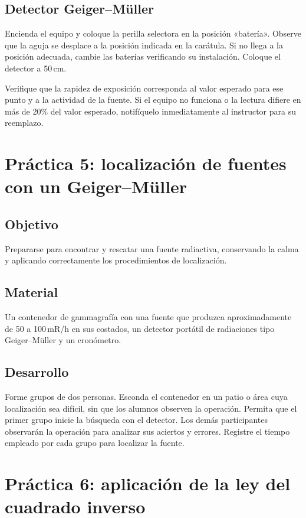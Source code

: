 \subsection*{Detector Geiger--Müller}
Encienda el equipo y coloque la perilla selectora en la posición «batería». Observe que la aguja se desplace a la posición indicada en la carátula. Si no llega a la posición adecuada, cambie las baterías verificando su instalación. Coloque el detector a 50\,cm.

Verifique que la rapidez de exposición corresponda al valor esperado para ese punto y a la actividad de la fuente. Si el equipo no funciona o la lectura difiere en más de 20\% del valor esperado, notifíquelo inmediatamente al instructor para su reemplazo.

\section{Práctica 5: localización de fuentes con un Geiger--Müller}

\subsection*{Objetivo}
Prepararse para encontrar y rescatar una fuente radiactiva, conservando la calma y aplicando correctamente los procedimientos de localización.

\subsection*{Material}
Un contenedor de gammagrafía con una fuente que produzca aproximadamente de 50 a 100\,mR/h en sus costados, un detector portátil de radiaciones tipo Geiger--Müller y un cronómetro.

\subsection*{Desarrollo}
Forme grupos de dos personas. Esconda el contenedor en un patio o área cuya localización sea difícil, sin que los alumnos observen la operación. Permita que el primer grupo inicie la búsqueda con el detector. Los demás participantes observarán la operación para analizar sus aciertos y errores. Registre el tiempo empleado por cada grupo para localizar la fuente.

\section{Práctica 6: aplicación de la ley del cuadrado inverso}

